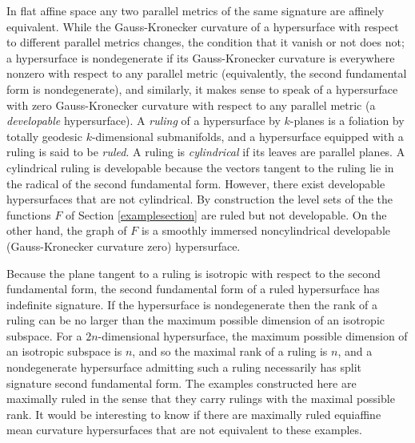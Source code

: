 \documentclass [leqno, 10pt]{amsart}
\theoremstyle{definition}
\numberwithin{equation}{section}
\begin{document}
In flat affine space any two parallel metrics of the same signature are affinely equivalent. While the Gauss-Kronecker curvature of a hypersurface with respect to different parallel metrics changes, the condition that it vanish or not does not; a hypersurface is nondegenerate if its Gauss-Kronecker curvature is everywhere nonzero with respect to any parallel metric (equivalently, the second fundamental form is nondegenerate), and similarly, it makes sense to speak of a hypersurface with zero Gauss-Kronecker curvature with respect to any parallel metric (a \textit{developable} hypersurface). A \textit{ruling} of a hypersurface by $k$-planes is a foliation by totally geodesic $k$-dimensional submanifolds, and a hypersurface equipped with a ruling is said to be \textit{ruled}. A ruling is \textit{cylindrical} if its leaves are parallel planes. A cylindrical ruling is developable because the vectors tangent to the ruling lie in the radical of the second fundamental form. However, there exist developable hypersurfaces that are not cylindrical. 
By construction the level sets of the the functions $F$ of Section \ref{examplesection} are ruled but not developable. On the other hand, the graph of $F$ is a smoothly immersed noncylindrical developable (Gauss-Kronecker curvature zero) hypersurface.

Because the plane tangent to a ruling is isotropic with respect to the second fundamental form, the second fundamental form of a ruled hypersurface has indefinite signature. If the hypersurface is nondegenerate then the rank of a ruling can be no larger than the maximum possible dimension of an isotropic subspace. For a $2n$-dimensional hypersurface, the maximum possible dimension of an isotropic subspace is $n$, and so the maximal rank of a ruling is $n$, and a nondegenerate hypersurface admitting such a ruling necessarily has split signature second fundamental form. The examples constructed here are maximally ruled in the sense that they carry rulings with the maximal possible rank. It would be interesting to know if there are maximally ruled equiaffine mean curvature hypersurfaces that are not equivalent to these examples.
\end{document}
